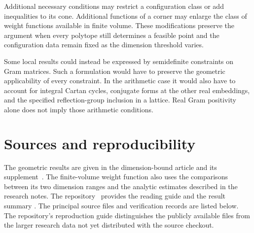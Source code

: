 \documentclass[11pt]{article}
\theoremstyle{definition}
\theoremstyle{remark}
\numberwithin{equation}{section}
\begin{document}
Additional necessary conditions may restrict a configuration class
or add inequalities to its cone. Additional functions of a corner
may enlarge the class of weight functions available in finite
volume. These modifications preserve the argument when every
polytope still determines a feasible point and the configuration
data remain fixed as the dimension threshold varies.

Some local results could instead be expressed by semidefinite
constraints on Gram matrices. Such a formulation would have to
preserve the geometric applicability of every constraint. In the
arithmetic case it would also have to account for integral Cartan
cycles, conjugate forms at the other real embeddings, and the
specified reflection-group inclusion in a lattice. Real Gram
positivity alone does not imply those arithmetic conditions.

\appendix
\section{Sources and reproducibility}
\label{app:reproduction}

The geometric results are given in the dimension-bound article and
its supplement~\cite{BoundsArticle,BoundsSupplement}. The
finite-volume weight function also uses the comparisons between
its two dimension ranges and the analytic estimates described in
the research notes. The repository~\cite{LPRepository} provides
the reading guide  and the
result summary
.
The principal source files and verification records are listed
below. The repository's reproduction guide distinguishes the
publicly available files from the larger research data not yet
distributed with the source checkout.
\end{document}
